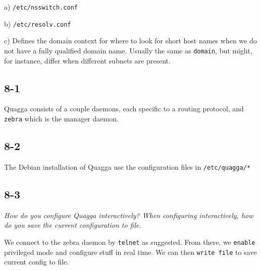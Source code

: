 a) \verb=/etc/nsswitch.conf=

b) \verb=/etc/resolv.conf=

c) Defines the domain context for where to look for short host names when we do not have a fully qualified domain name. Usually the same as \verb=domain=, but might, for instance, differ when different subnets are present.



\subsection{8-1}
Quagga consists of a couple daemons, each specific to a routing protocol, and \verb=zebra= which is the manager daemon.

\subsection{8-2}
The Debian installation of Quagga use the configuration files in \verb=/etc/quagga/*=

\subsection{8-3}
\emph{How do you configure Quagga interactively? When configuring interactively, how do you save the current configuration to file.}

We connect to the zebra daemon by \verb=telnet= as suggested. From there, we \verb=enable= privileged mode and configure stuff in real time. We can then \verb=write file= to save current config to file.



